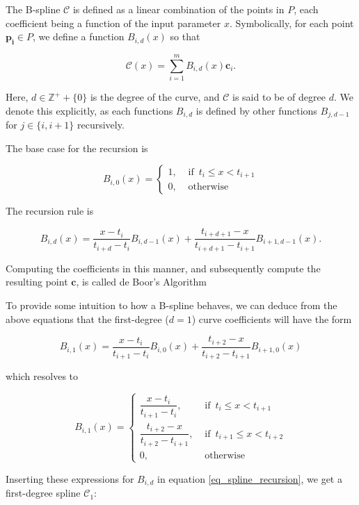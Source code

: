 \documentclass[english]{article}
\begin{document}
The B-spline $\mathcal{C}$ is defined as a linear combination of the points in $P$, each coefficient being a function of the input parameter $x$. Symbolically, for each point $\mathbf{p_i} \in P$, we define a function $B_{i,d}(x)$ so that

\[
\mathcal{C}(x) = \sum_{i = 1}^mB_{i,d}(x)\mathbf{c}_i.
\]

Here, $d \in \mathbb{Z^+} + \{0\}$ is the degree of the curve, and $\mathcal{C}$ is said to be of degree $d$. We denote this explicitly, as each functions $B_{i,d}$ is defined by other functions $B_{j,d-1}$ for $j \in \{i, i + 1\}$ recursively.

The base case for the recursion is

\begin{equation}
B_{i,0}(x) = \begin{cases}
  1, &\text{ if } \, t_i \leq x < t_{i + 1} \\
  0, &\text{ otherwise }
\end{cases}
\end{equation}

The recursion rule is

\begin{equation} \label{eq_spline_recursion}
B_{i,d}(x) = \dfrac{x - t_i}{t_{i + d} - t_i}B_{i,d - 1}(x) + \dfrac{t_{i + d + 1} - x}{t_{i + d + 1} - t_{i + 1}}B_{i + 1,d - 1}(x).
\end{equation}

Computing the coefficients in this manner, and subsequently compute the resulting point $\mathbf{c}$, is called de Boor's Algorithm

To provide some intuition to how a B-spline behaves, we can deduce from the above equations that the first-degree ($d = 1$) curve coefficients will have the form

\[
B_{i,1}(x) = \dfrac{x - t_i}{t_{i + 1} - t_i}B_{i,0}(x) + \dfrac{t_{i + 2} - x}{t_{i + 2} - t_{i + 1}}B_{i + 1,0}(x)
\]

which resolves to

\[
B_{i,1}(x) =
\begin{cases}
  \dfrac{x - t_i}{t_{i + 1} - t_i},            &\text{ if } \, t_i \leq x < t_{i + 1} \\
  \dfrac{t_{i + 2} - x}{t_{i + 2} - t_{i + 1}}, &\text{ if } \, t_{i + 1} \leq x < t_{i + 2} \\
  0, &\text{ otherwise }
\end{cases}
\]

Inserting these expressions for $B_{i,d}$ in equation \ref{eq_spline_recursion}, we get a first-degree spline $\mathcal{C}_1$:
\end{document}
